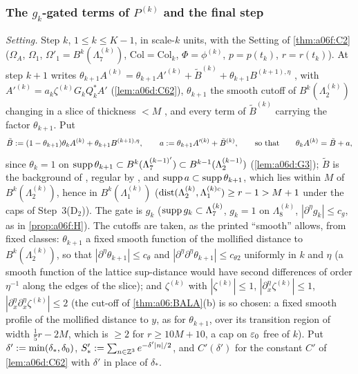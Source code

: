 
\subsubsection*{The $g_k$-gated terms of $P^{(k)}$ and the final step \cite[p.~579, (2.116)]{Ba2}}

\emph{Setting.} Step $k$, $1\le k\le K-1$, in scale-$k$ units, with the Setting of \cref{thm:a06f:C2} ($\Omega_A$, $\Omega_1$, $\Omega'_1=B^k(\Lambda^{(k)}_7)$, $\mathrm{Col}=\mathrm{Col}_k$, $\Phi=\phi^{(k)}$, $p=p(t_k)$, $r=r(t_k)$). At step $k+1$ \cite{Ba2} writes $\theta_{k+1}A^{(k)}=\theta_{k+1}A'^{(k)}+\tilde B^{(k)}+\theta_{k+1}B^{(k+1),\eta}$ \cite[(2.88)--(2.89)]{Ba2}, with $A'^{(k)}=a_k\zeta^{(k)}G_kQ_k^*A'$ (\cref{lem:a06d:C62}), $\theta_{k+1}$ the smooth cutoff of $B^k(\Lambda^{(k)}_2)$ changing in a slice of thickness $<M$ \cite[p.~567]{Ba2}, and every term of $\tilde B^{(k)}$ carrying the factor $\theta_{k+1}$. Put
\[
\tilde B:=(1-\theta_{k+1})\theta_kA^{(k)}+\theta_{k+1}B^{(k+1),\eta},\qquad a:=\theta_{k+1}A'^{(k)}+\tilde B^{(k)},\qquad\text{so that}\qquad\theta_kA^{(k)}=\tilde B+a,
\]
since $\theta_k=1$ on $\operatorname{supp}\theta_{k+1}\subset B^k(\Lambda^{(k-1)'}_7)\subset B^{k-1}(\Lambda^{(k-1)}_2)$ (\cref{lem:a06d:G3}); $\tilde B$ is the background of \cite[p.~582]{Ba2}, regular by \cite[(2.94)--(2.98)]{Ba2}, and $\operatorname{supp} a\subset\operatorname{supp}\theta_{k+1}$, which lies within $M$ of $B^k(\Lambda^{(k)}_2)$, hence in $B^k(\Lambda^{(k)}_1)$ ($\operatorname{dist}(\Lambda^{(k)}_2,\Lambda^{(k)c}_1)\ge r-1>M+1$ under the caps of Step~3(D$_2$)). The gate is $g_k$ ($\operatorname{supp} g_k\subset\Lambda^{(k)}_7$, $g_k=1$ on $\Lambda^{(k)}_8$, $|\partial^\eta g_k|\le c_g$, as in \cref{prop:a06f:H}). The cutoffs are taken, as the printed ``smooth'' allows, from fixed classes: $\theta_{k+1}$ a fixed smooth function of the mollified distance to $B^k(\Lambda^{(k)}_2)$, so that $|\partial^\eta\theta_{k+1}|\le c_\theta$ and $|\partial^\eta\partial^\eta\theta_{k+1}|\le c_{\theta2}$ uniformly in $k$ and $\eta$ (a smooth function of the lattice sup-distance would have second differences of order $\eta^{-1}$ along the edges of the slice); and $\zeta^{(k)}$ with $|\zeta^{(k)}|\le1$, $|\partial^\eta_x\zeta^{(k)}|\le1$, $|\partial^\eta_x\partial^\eta_x\zeta^{(k)}|\le2$ (the cut-off of \cref{thm:a06:BALA}(b) is so chosen: a fixed smooth profile of the mollified distance to $y$, as for $\theta_{k+1}$, over its transition region of width $\frac15r-2M$, which is $\ge2$ for $r\ge10M+10$, a cap on $\varepsilon_0$ free of $k$). Put $\delta':=\min(\delta_*,\delta_0)$, $S'_*:=\sum_{n\in\mathbb Z^3}e^{-\delta'|n|/2}$, and $C'(\delta')$ for the constant $C'$ of \cref{lem:a06d:C62} with $\delta'$ in place of $\delta_*$.

